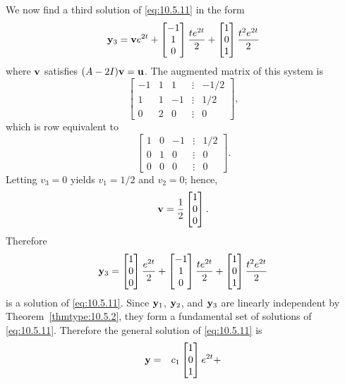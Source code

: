 \documentclass{ximera}
\begin{document}
\begin{example}
\begin{explanation}
We  now find a third solution of  \eqref{eq:10.5.11}  in the form
$$
{\bf y}_3={\bf
v}e^{2t}+\begin{bmatrix}-1\\1\\0\end{bmatrix}\frac{te^{2t}}{2}+\begin{bmatrix}1\\0\\1\end{bmatrix}\frac{t^2e^{2t}}{2}
$$
where ${\bf v}$ satisfies $(A-2I){\bf v}={\bf u}$.
The  augmented matrix  of this system is
$$
\begin{bmatrix} -1 & 1 & 1 &\vdots &-1/2\\
1& 1 & -1 &\vdots & 1/2\\ 0 & 2 & 0 &
\vdots & 0\end{bmatrix}, $$
which is row equivalent to
$$
\begin{bmatrix} 1 & 0 &- 1 &\vdots& 1/2\\ 0 & 1 & 0
&\vdots& 0\\ 0 & 0 & 0 &\vdots&0\end{bmatrix}.
$$
Letting $v_3=0$ yields $v_1=1/2$ and $v_2=0$; hence,
$$
{\bf v}=\frac{1}{2}\begin{bmatrix}1\\0\\0\end{bmatrix}.
$$
Therefore
$$
{\bf y}_3=\begin{bmatrix}1\\0\\0\end{bmatrix}\frac{e^{2t}}{2}+
\begin{bmatrix}-1\\1\\0\end{bmatrix}\frac{te^{2t}}{2}+\begin{bmatrix}1\\0\\1\end{bmatrix}\frac{t^2e^{2t}}{2}
$$
is a solution of  \eqref{eq:10.5.11}. Since ${\bf y}_1$, ${\bf y}_2$, and
${\bf y}_3$ are linearly independent by Theorem~\ref{thmtype:10.5.2}, they
form a fundamental set of solutions of \eqref{eq:10.5.11}. Therefore the
general solution of \eqref{eq:10.5.11} is
\begin{eqnarray*}
{\bf y} &=&c_1\begin{bmatrix}1\\0\\1\end{bmatrix}e^{2t}+

\end{eqnarray*}
\end{explanation}
\end{example}
\end{document}
